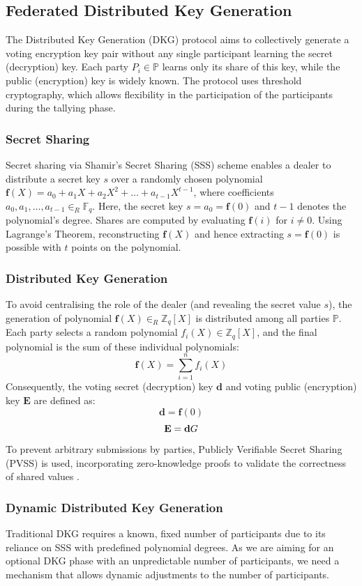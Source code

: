 \documentclass[runningheads]{llncs}
\begin{document}
\subsection{Federated Distributed Key Generation}
The Distributed Key Generation (DKG) protocol aims to collectively generate a voting encryption key pair without any single participant learning the secret (decryption) key. Each party $P_i \in \mathbb{P}$ learns only its share of this key, while the public (encryption) key is widely known. The protocol uses threshold cryptography, which allows flexibility in the participation of the participants during the tallying phase.

\subsubsection*{Secret Sharing}
Secret sharing via Shamir's Secret Sharing (SSS) scheme enables a dealer to distribute a secret key $s$ over a randomly chosen polynomial $\mathbf{f}(X) = a_0 + a_1X + a_2X^2 + \dots + a_{t-1}X^{t-1}$, where coefficients $a_0,a_1,\dots,a_{t-1} \in_R \mathbb{F}_q$. Here, the secret key $s=a_0=\mathbf{f}(0)$ and $t-1$ denotes the polynomial's degree. Shares are computed by evaluating $\mathbf{f}(i)$ for $i \neq 0$. Using Lagrange's Theorem, reconstructing $\mathbf{f}(X)$ and hence extracting $s = \mathbf{f}(0)$ is possible with $t$ points on the polynomial.

\subsubsection*{Distributed Key Generation}
To avoid centralising the role of the dealer (and revealing the secret value $s$), the generation of polynomial $\mathbf{f}(X) \in_R \mathbb{Z}_q[X]$ is distributed among all parties $\mathbb{P}$. Each party selects a random polynomial $f_{i}(X) \in \mathbb{Z}_q[X]$, and the final polynomial is the sum of these individual polynomials: \[\mathbf{f}(X)=\sum_{i=1}^{n}f_i(X)\] Consequently, the voting secret (decryption) key $\mathbf{d}$ and voting public (encryption) key $\mathbf{E}$ are defined as: $$\mathbf{d}=\mathbf{f}(0)$$ $$\mathbf{E}=\mathbf{d} G$$ 
To prevent arbitrary submissions by parties, Publicly Verifiable Secret Sharing (PVSS) is used, incorporating zero-knowledge proofs to validate the correctness of shared values \cite{goosSimplePubliclyVerifiable1999}.

\subsubsection*{Dynamic Distributed Key Generation}
Traditional DKG requires a known, fixed number of participants due to its reliance on SSS with predefined polynomial degrees. As we are aiming for an optional DKG phase with an unpredictable number of participants, we need a mechanism that allows dynamic adjustments to the number of participants.
\end{document}
